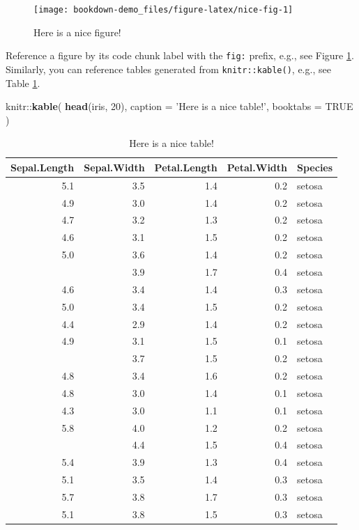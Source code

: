 \documentclass[]{book}
\newenvironment{Shaded}{\begin{snugshade}}{\end{snugshade}}
\newcommand{\KeywordTok}[1]{\textcolor[rgb]{0.13,0.29,0.53}{\textbf{{#1}}}}
\newcommand{\DataTypeTok}[1]{\textcolor[rgb]{0.13,0.29,0.53}{{#1}}}
\newcommand{\DecValTok}[1]{\textcolor[rgb]{0.00,0.00,0.81}{{#1}}}
\newcommand{\StringTok}[1]{\textcolor[rgb]{0.31,0.60,0.02}{{#1}}}
\newcommand{\OtherTok}[1]{\textcolor[rgb]{0.56,0.35,0.01}{{#1}}}
\newcommand{\NormalTok}[1]{{#1}}
\begin{document}
\begin{figure}

{\centering \texttt{[image: bookdown-demo\_files/figure-latex/nice-fig-1]} 

}

\caption{Here is a nice figure!}\label{fig:nice-fig}
\end{figure}

Reference a figure by its code chunk label with the \texttt{fig:}
prefix, e.g., see Figure \ref{fig:nice-fig}. Similarly, you can
reference tables generated from \texttt{knitr::kable()}, e.g., see Table
\ref{tab:nice-tab}.

\begin{Shaded}
\begin{Highlighting}[]
\NormalTok{knitr::}\KeywordTok{kable}\NormalTok{(}
  \KeywordTok{head}\NormalTok{(iris, }\DecValTok{20}\NormalTok{), }\DataTypeTok{caption =} \StringTok{'Here is a nice table!'}\NormalTok{,}
  \DataTypeTok{booktabs =} \OtherTok{TRUE}
\NormalTok{)}
\end{Highlighting}
\end{Shaded}

\begin{table}

\caption{\label{tab:nice-tab}Here is a nice table!}
\centering
\begin{tabular}[t]{rrrrl}
\toprule
Sepal.Length & Sepal.Width & Petal.Length & Petal.Width & Species\\
\midrule
5.1 & 3.5 & 1.4 & 0.2 & setosa\\
4.9 & 3.0 & 1.4 & 0.2 & setosa\\
4.7 & 3.2 & 1.3 & 0.2 & setosa\\
4.6 & 3.1 & 1.5 & 0.2 & setosa\\
5.0 & 3.6 & 1.4 & 0.2 & setosa\\
\addlinespace
5.4 & 3.9 & 1.7 & 0.4 & setosa\\
4.6 & 3.4 & 1.4 & 0.3 & setosa\\
5.0 & 3.4 & 1.5 & 0.2 & setosa\\
4.4 & 2.9 & 1.4 & 0.2 & setosa\\
4.9 & 3.1 & 1.5 & 0.1 & setosa\\
\addlinespace
5.4 & 3.7 & 1.5 & 0.2 & setosa\\
4.8 & 3.4 & 1.6 & 0.2 & setosa\\
4.8 & 3.0 & 1.4 & 0.1 & setosa\\
4.3 & 3.0 & 1.1 & 0.1 & setosa\\
5.8 & 4.0 & 1.2 & 0.2 & setosa\\
\addlinespace
5.7 & 4.4 & 1.5 & 0.4 & setosa\\
5.4 & 3.9 & 1.3 & 0.4 & setosa\\
5.1 & 3.5 & 1.4 & 0.3 & setosa\\
5.7 & 3.8 & 1.7 & 0.3 & setosa\\
5.1 & 3.8 & 1.5 & 0.3 & setosa\\
\bottomrule
\end{tabular}
\end{table}
\end{document}
